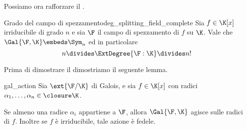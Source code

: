 Possiamo ora rafforzare il .

\begin{theorem}
    {Grado del campo di spezzamento}{deg_splitting_field_complete}
    Sia $f \in \K[x]$ irriducibile di grado $n$ e sia $\F$ il campo di spezzamento di $f$ su $\K$. Vale che $\Gal{\F, \K} \embeds \Sym_n$ ed in particolare \[
        n \divides \ExtDegree{\F : \K} \divides n!
    \]
\end{theorem}

Prima di dimostrare il  dimostriamo il seguente lemma.
\begin{lemma}
    {}{gal_action}
    Sia $\ext{\F / \K}$ di Galois, e sia $f \in \K[x]$ con radici $\alpha_1, \dots, \alpha_n \in \closure\K$. 
    
    Se almeno una radice $\alpha_i$ appartiene a $\F$, allora $\Gal{\F, \K}$ agisce sulle radici di $f$. Inoltre se $f$ è irriducibile, tale azione è fedele.
\end{lemma}
